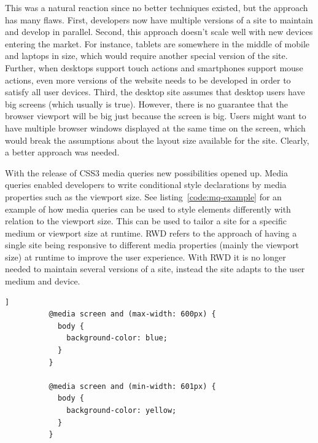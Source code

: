\documentclass[a4paper,11pt]{kth-mag}
\begin{document}
        This was a natural reaction since no better techniques existed, but the approach has many flaws.
        First, developers now have multiple versions of a site to maintain and develop in parallel.
        Second, this approach doesn't scale well with new devices entering the market.
        For instance, tablets are somewhere in the middle of mobile and laptops in size, which would require another special version of the site.
        Further, when desktops support touch actions and smartphones support mouse actions, even more versions of the website needs to be developed in order to satisfy all user devices.
        Third, the desktop site assumes that desktop users have big screens (which usually is true).
        However, there is no guarantee that the \gls{browser} \gls{viewport} will be big just because the screen is big.
        Users might want to have multiple \gls{browser} windows displayed at the same time on the screen, which would break the assumptions about the layout size available for the site.
        Clearly, a better approach was needed.

        With the release of \gls{CSS3} \gls{media queries} new possibilities opened up.
        Media queries enabled developers to write conditional style declarations by media properties such as the \gls{viewport} size.
        See listing~\ref{code:mq-example} for an example of how \gls{media queries} can be used to style \glspl{element} differently with relation to the viewport size.
        This can be used to tailor a site for a specific medium or \gls{viewport} size at runtime.
        \gls{RWD} refers to the approach of having a single site being \gls{responsive} to different media properties (mainly the \gls{viewport} size) at runtime to improve the user experience.
        With \gls{RWD} it is no longer needed to maintain several versions of a site, instead the site adapts to the user medium and device.

        \begin{lstlisting}[gobble=10,label={code:mq-example},caption={The above \gls{CSS} styles the body of the website blue if the \gls{viewport} is less or equal to 600 pixels wide, and yellow otherwise.},captionpos=b]]
          @media screen and (max-width: 600px) {
            body {
              background-color: blue;
            }
          }

          @media screen and (min-width: 601px) {
            body {
              background-color: yellow;
            }
          }
        \end{lstlisting}
\end{document}

